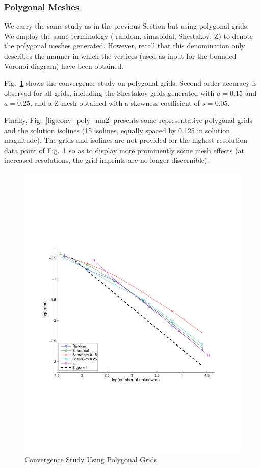 \documentclass[preprint,10pt]{elsarticle}
\newcommand{\fig}[1]{Fig.~\ref{#1}}                      %
\begin{document}
\subsubsection{Polygonal Meshes}

We carry the same study as in the previous Section but using polygonal grids. We employ the same terminology (
random, sinusoidal, Shestakov, Z) to denote the polygonal meshes generated. However, recall that this denomination
only describes the manner in which the vertices (used as input for the bounded Voronoi diagram) have been obtained.

\fig{fig:conv_rate_poly} shows the convergence study on polygonal grids. Second-order accuracy is observed for all 
grids, including the Shestakov grids generated with $a=0.15$ and $a=0.25$, and a Z-mesh obtained with a skewness 
coefficient of $s=0.05$.


Finally, \fig{fig:conv_poly_nm2} presents some representative polygonal grids and the solution isolines (15 isolines, equally spaced by 0.125 in solution magnitude). The grids and isolines are not provided for the highest resolution data point of \fig{fig:conv_rate_poly} so as to display more prominently some mesh effects (at increased resolutions, the grid imprints are no longer discernible).


\begin{figure}[!hbtp]
\centering
\includegraphics[scale=0.5]{../pwld_diffusion/results/convergence/cv_poly}
\caption{Convergence Study Using Polygonal Grids}
\label{fig:conv_rate_poly}
\end{figure}
\end{document}
